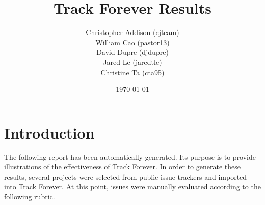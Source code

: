 \documentclass{article}
\begin{document}
	\begin{titlepage}
		\title{Track Forever Results}
		\date{\today}
		\author{ Christopher Addison (cjteam) \\
			William Cao (pastor13) \\
			David Dupre (djdupre) \\
			Jared Le (jaredtle) \\
			Christine Ta (cta95) }
		\maketitle
	\end{titlepage}
	
	\section{Introduction}
	The following report has been automatically generated. Its purpose is to provide 
	illustrations of the effectiveness of Track Forever. In order to generate these results, 
	several projects were selected from public issue trackers and imported into Track Forever. 
	At this point, issues were manually evaluated according to the following rubric.
	
\end{document}
